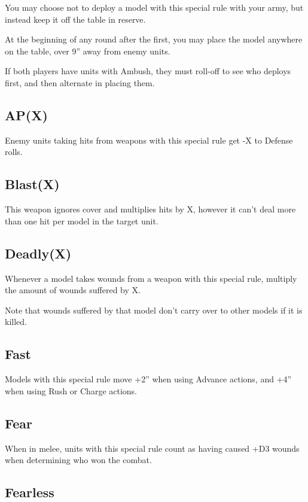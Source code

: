 \documentclass[9pt, a4paper]{extarticle}            %
\begin{document}
\begin{multicols}{2}
You may choose not to deploy a model with this special rule with your army, but instead keep it off the table in reserve.

At the beginning of any round after the first, you may place the model anywhere on the table, over 9” away from enemy units.

If both players have units with Ambush, they must roll-off to see who deploys first, and then alternate in placing them.

\subsection{AP(X)}

Enemy units taking hits from weapons with this special rule get -X to Defense rolls.

\subsection{Blast(X)}

This weapon ignores cover and multiplies hits by X, however it can’t deal more than one hit per model in the target unit.

\vfill\null

\columnbreak

\subsection{Deadly(X)}

Whenever a model takes wounds from a weapon with this special rule, multiply the amount of wounds suffered by X.

Note that wounds suffered by that model don’t carry over to other models if it is killed.

\subsection{Fast}

Models with this special rule move +2” when using Advance actions, and +4” when using Rush or Charge actions.

\subsection{Fear}

When in melee, units with this special rule count as having caused +D3 wounds when determining who won the combat.

\subsection{Fearless}


\end{multicols}
\end{document}
